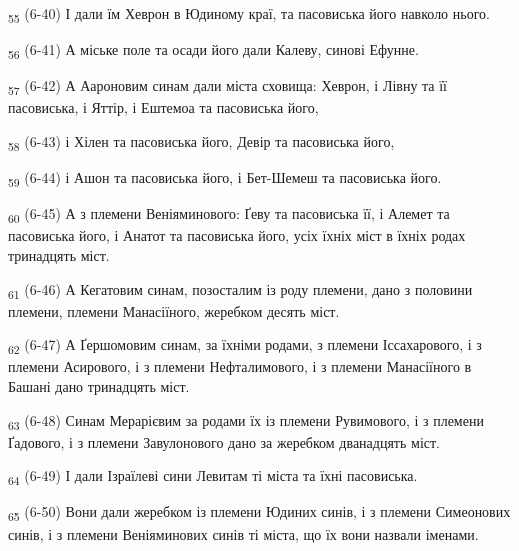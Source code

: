 \begin{tcolorbox}
\textsubscript{55} (6-40) І дали їм Хеврон в Юдиному краї, та пасовиська його навколо нього.
\end{tcolorbox}
\begin{tcolorbox}
\textsubscript{56} (6-41) А міське поле та осади його дали Калеву, синові Ефунне.
\end{tcolorbox}
\begin{tcolorbox}
\textsubscript{57} (6-42) А Аароновим синам дали міста сховища: Хеврон, і Лівну та її пасовиська, і Яттір, і Ештемоа та пасовиська його,
\end{tcolorbox}
\begin{tcolorbox}
\textsubscript{58} (6-43) і Хілен та пасовиська його, Девір та пасовиська його,
\end{tcolorbox}
\begin{tcolorbox}
\textsubscript{59} (6-44) і Ашон та пасовиська його, і Бет-Шемеш та пасовиська його.
\end{tcolorbox}
\begin{tcolorbox}
\textsubscript{60} (6-45) А з племени Веніяминового: Ґеву та пасовиська її, і Алемет та пасовиська його, і Анатот та пасовиська його, усіх їхніх міст в їхніх родах тринадцять міст.
\end{tcolorbox}
\begin{tcolorbox}
\textsubscript{61} (6-46) А Кегатовим синам, позосталим із роду племени, дано з половини племени, племени Манасіїного, жеребком десять міст.
\end{tcolorbox}
\begin{tcolorbox}
\textsubscript{62} (6-47) А Ґершомовим синам, за їхніми родами, з племени Іссахарового, і з племени Асирового, і з племени Нефталимового, і з племени Манасіїного в Башані дано тринадцять міст.
\end{tcolorbox}
\begin{tcolorbox}
\textsubscript{63} (6-48) Синам Мерарієвим за родами їх із племени Рувимового, і з племени Ґадового, і з племени Завулонового дано за жеребком дванадцять міст.
\end{tcolorbox}
\begin{tcolorbox}
\textsubscript{64} (6-49) І дали Ізраїлеві сини Левитам ті міста та їхні пасовиська.
\end{tcolorbox}
\begin{tcolorbox}
\textsubscript{65} (6-50) Вони дали жеребком із племени Юдиних синів, і з племени Симеонових синів, і з племени Веніяминових синів ті міста, що їх вони назвали іменами.
\end{tcolorbox}
